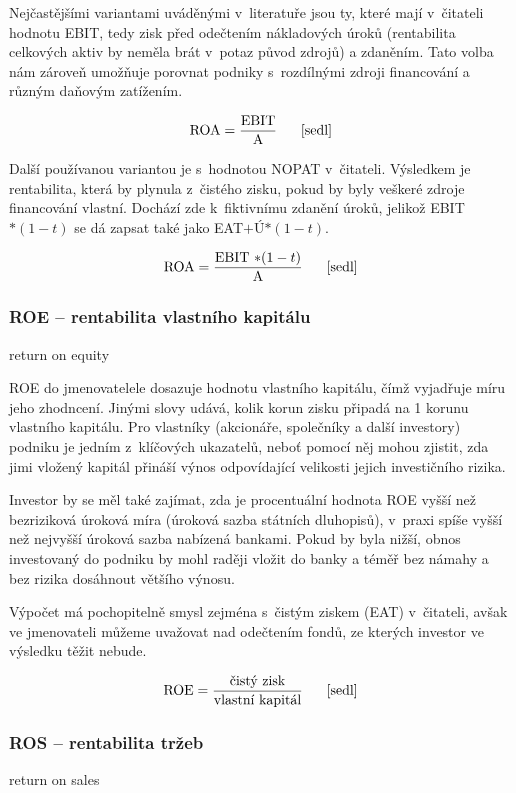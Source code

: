 Nejčastějšími variantami uváděnými v~literatuře jsou ty, které mají v~čitateli hodnotu EBIT, tedy zisk před odečtením nákladových úroků (rentabilita celkových aktiv by neměla brát v~potaz původ zdrojů) a zdaněním. Tato volba nám zároveň umožňuje porovnat podniky s~rozdílnými zdroji financování a různým daňovým zatížením.

$$\vz{ROA}{EBIT}{A} \scite{sedl}$$

Další používanou variantou je s~hodnotou NOPAT v~čitateli. Výsledkem je rentabilita, která by plynula z~čistého zisku, pokud by byly veškeré zdroje financování vlastní. Dochází zde k~fiktivnímu zdanění úroků, jelikož EBIT$*(1-t)$ se dá zapsat také jako EAT$+$Ú$*(1-t)$.

$$\vz{ROA}{EBIT $*(1-t)$}{A} \scite{sedl}$$ 


\subsubsection{ROE -- rentabilita vlastního kapitálu}
return on equity

ROE do jmenovatelele dosazuje hodnotu vlastního kapitálu, čímž vyjadřuje míru jeho zhodncení. Jinými slovy udává, kolik korun zisku připadá na 1 korunu vlastního kapitálu. Pro vlastníky (akcionáře, společníky a další investory) podniku je jedním z~klíčových ukazatelů, neboť pomocí něj mohou zjistit, zda jimi vložený kapitál přináší výnos odpovídající velikosti jejich investičního rizika\cite{sedl}.

Investor by se měl také zajímat, zda je procentuální hodnota ROE vyšší než bezriziková úroková míra (úroková sazba státních dluhopisů), v~praxi spíše vyšší než nejvyšší úroková sazba nabízená bankami. Pokud by byla nižší, obnos investovaný do podniku by mohl raději vložit do banky a téměř bez námahy a bez rizika dosáhnout většího výnosu.

Výpočet má pochopitelně smysl zejména s~čistým ziskem (EAT) v~čitateli, avšak ve jmenovateli můžeme uvažovat nad odečtením fondů, ze kterých investor ve výsledku těžit nebude.

$$\vz{ROE}{čistý zisk}{vlastní kapitál} \scite{sedl}$$ 


\subsubsection{ROS -- rentabilita tržeb}
return on sales

